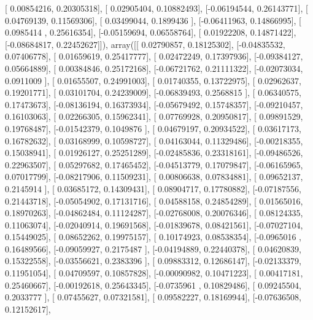 \documentclass{article}
\begin{document}
       [ 0.00854216,  0.20305318],
       [ 0.02905404,  0.10882493],
       [-0.06194544,  0.26143771],
       [ 0.04769139,  0.11569306],
       [ 0.03499044,  0.1899436 ],
       [-0.06411963,  0.14866995],
       [ 0.0985414 ,  0.25616354],
       [-0.05159694,  0.06558764],
       [ 0.01922208,  0.14871422],
       [-0.08684817,  0.22452627]]), array([[ 0.02790857,  0.18125302],
       [-0.04835532,  0.07406778],
       [ 0.01659619,  0.25417777],
       [ 0.02472249,  0.17397936],
       [-0.09384127,  0.05664889],
       [ 0.00384846,  0.25172168],
       [-0.06721762,  0.21111322],
       [-0.02073034,  0.0911009 ],
       [ 0.01655507,  0.24991003],
       [ 0.01740355,  0.13722975],
       [ 0.02962637,  0.19201771],
       [ 0.03101704,  0.24239009],
       [-0.06839493,  0.2568815 ],
       [ 0.06340575,  0.17473673],
       [-0.08136194,  0.16373934],
       [-0.05679492,  0.15748357],
       [-0.09210457,  0.16103063],
       [ 0.02266305,  0.15962341],
       [ 0.07769928,  0.20950817],
       [ 0.09891529,  0.19768487],
       [-0.01542379,  0.1049876 ],
       [ 0.04679197,  0.20934522],
       [ 0.03617173,  0.16782632],
       [ 0.03168999,  0.10598727],
       [ 0.04163044,  0.11329486],
       [-0.00218355,  0.15038941],
       [ 0.01926127,  0.25251289],
       [-0.02485836,  0.23318161],
       [-0.09486526,  0.22963507],
       [ 0.05297682,  0.17465452],
       [-0.04513779,  0.17079847],
       [-0.06165965,  0.07017799],
       [-0.08217906,  0.11509231],
       [ 0.00806638,  0.07834881],
       [ 0.09652137,  0.2145914 ],
       [ 0.03685172,  0.14309431],
       [ 0.08904717,  0.17780882],
       [-0.07187556,  0.21443718],
       [-0.05054902,  0.17131716],
       [ 0.04588158,  0.24854289],
       [ 0.01565016,  0.18970263],
       [-0.04862484,  0.11124287],
       [-0.02768008,  0.20076346],
       [ 0.08124335,  0.11063074],
       [-0.02040914,  0.19691568],
       [-0.01839678,  0.08421561],
       [-0.07027104,  0.15449025],
       [ 0.08652262,  0.19975157],
       [ 0.10174923,  0.08538354],
       [-0.0965016 ,  0.16489566],
       [-0.09059927,  0.2175487 ],
       [-0.04194889,  0.22440378],
       [ 0.04620839,  0.15322558],
       [-0.03556621,  0.2383396 ],
       [ 0.09883312,  0.12686147],
       [-0.02133379,  0.11951054],
       [ 0.04709597,  0.10857828],
       [-0.00090982,  0.10471223],
       [ 0.00417181,  0.25460667],
       [-0.00192618,  0.25643345],
       [-0.0735961 ,  0.10829486],
       [ 0.09245504,  0.2033777 ],
       [ 0.07455627,  0.07321581],
       [ 0.09582227,  0.18169944],
       [-0.07636508,  0.12152617],
\end{document}
